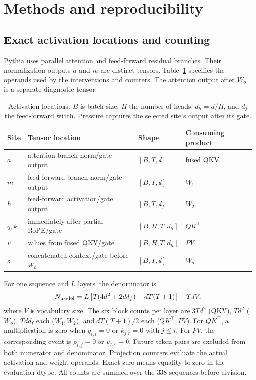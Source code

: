 \section{Methods and reproducibility}
\label{app:methods}
\subsection{Exact activation locations and counting}
\label{app:counting}
Pythia uses parallel attention and feed-forward residual branches. Their
normalization outputs $a$ and $m$ are distinct tensors.
Table~\ref{tab:sites} specifies the operands used by the interventions and
counters. The attention output after $W_o$ is a separate diagnostic tensor.

\begin{table}[h]
\centering
\caption{Activation locations. $B$ is batch size, $H$ the number of heads,
$d_h=d/H$, and $d_f$ the feed-forward width. Pressure captures the selected
site's output after its gate.}
\label{tab:sites}
\small
\begin{tabular}{llll}
\toprule
Site & Tensor location & Shape & Consuming product \\
\midrule
$a$ & attention-branch norm/gate output & $[B,T,d]$ & fused QKV \\
$m$ & feed-forward-branch norm/gate output & $[B,T,d]$ & $W_1$ \\
$h$ & feed-forward activation/gate output & $[B,T,d_f]$ & $W_2$ \\
$q,k$ & immediately after partial RoPE/gate & $[B,H,T,d_h]$ & $QK^\top$ \\
$v$ & values from fused QKV/gate & $[B,H,T,d_h]$ & $PV$ \\
$z$ & concatenated context/gate before $W_o$ & $[B,T,d]$ & $W_o$ \\
\bottomrule
\end{tabular}
\end{table}

For one sequence and $L$ layers, the denominator is
\begin{equation}
 N_{\rm model}
 =L\left[T(4d^2+2dd_f)+dT(T+1)\right]+TdV ,
 \label{eq:denominator}
\end{equation}
where $V$ is vocabulary size. The six block counts per layer are
$3Td^2$ (QKV), $Td^2$ ($W_o$), $Tdd_f$ each ($W_1,W_2$), and
$dT(T+1)/2$ each ($QK^\top,PV$).
For $QK^\top$, a multiplication is zero when
$q_{i,r}=0$ or $k_{j,r}=0$ with $j\leq i$.
For $PV$, the corresponding event is $p_{i,j}=0$ or $v_{j,r}=0$.
Future-token pairs are excluded from both numerator and denominator.
Projection counters evaluate the actual activation and weight operands.
Exact zero means equality to zero in the evaluation dtype.
All counts are summed over the 338 sequences before division.


